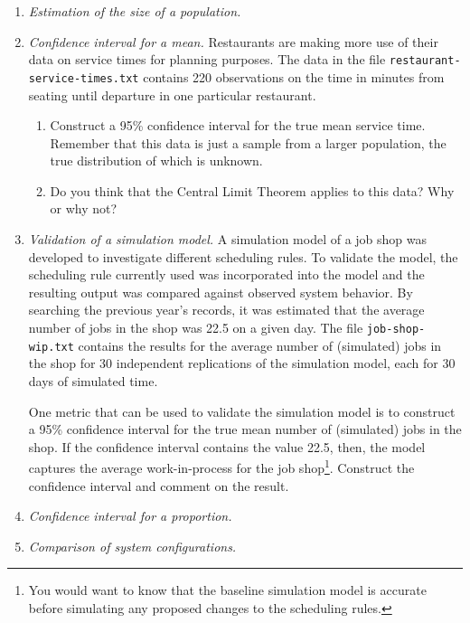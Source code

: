 \begin{enumerate}
\item \emph{Estimation of the size of a population.}


\item \emph{Confidence interval for a mean.} Restaurants are making
  more use of their data on service times for planning purposes.  The
  data in the file \texttt{restaurant-service-times.txt} contains 220
  observations on the time in minutes from seating until departure in
  one particular restaurant. 
\begin{enumerate}
\item Construct a 95\% confidence interval for the true mean service
  time. Remember that this data is just a sample from a larger
  population, the true distribution of which is unknown.
\item Do you think that the Central Limit Theorem applies to this
  data? Why or why not?
\end{enumerate}

\item \emph{Validation of a simulation model.} A simulation model of a
  job shop was developed to investigate different scheduling rules. To
  validate the model, the scheduling rule currently used was
  incorporated into the model and the resulting output was compared
  against observed system behavior. By searching the previous year’s
  records, it was estimated that the average number of jobs in the
  shop was 22.5 on a given day. The file \texttt{job-shop-wip.txt} contains the 
  results for the average number of (simulated) jobs in the shop for 30 independent 
  replications of the simulation model, each for 30 days of simulated time.

  One metric that can be used to validate the simulation model is to
  construct a 95\% confidence interval for the true mean number of
  (simulated) jobs in the shop. If the confidence interval
  contains the value 22.5, then, the model captures the average
  work-in-process for the job shop\footnote{You would want to know that the
  baseline simulation model is accurate before simulating any proposed
  changes to the scheduling rules.}. Construct the confidence interval
  and comment on the result.

\item \emph{Confidence interval for a proportion.} 

\item \emph{Comparison of system configurations.}



\end{enumerate}
